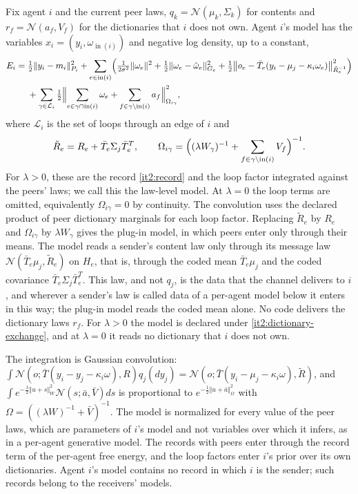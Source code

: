 Fix agent $i$ and the current peer laws, $q_k=\mathcal N(\mu_k,\Sigma_k)$ for contents and $r_f=\mathcal N(a_f,V_f)$ for the dictionaries that $i$ does not own. Agent $i$'s model has the variables $x_i=(y_i,\omega_{\operatorname{in}(i)})$ and negative log density, up to a constant,
\begin{equation}
\begin{aligned}
E_i={}&\tfrac12\Vert y_i-m_i\Vert_{P_i}^2+\sum_{e\in\operatorname{in}(i)}\Bigl(\tfrac1{2\sigma^2}\Vert\omega_e\Vert^2+\tfrac12\Vert\omega_e-\hat\omega_e\Vert_{G_e}^2+\tfrac12\bigl\Vert o_e-\bar T_e(y_i-\mu_j-\kappa_i\omega_e)\bigr\Vert_{\tilde R_e^{-1}}^2\Bigr)\\
&+\sum_{\gamma\in\mathcal L_i}\tfrac12\Bigl\Vert\sum_{e\in\gamma\cap\operatorname{in}(i)}\omega_e+\sum_{f\in\gamma\setminus\operatorname{in}(i)}a_f\Bigr\Vert_{\Omega_{i\gamma}}^2,
\end{aligned}
\label{it2:agent-energy}
\end{equation}
where $\mathcal L_i$ is the set of loops through an edge of $i$ and
\begin{equation}
\tilde R_e=R_e+\bar T_e\Sigma_j\bar T_e^T,\qquad
\Omega_{i\gamma}=\Bigl((\lambda W_\gamma)^{-1}+\sum_{f\in\gamma\setminus\operatorname{in}(i)}V_f\Bigr)^{-1}.
\label{it2:widening}
\end{equation}
For $\lambda>0$, these are the record \cref{it2:record} and the loop factor integrated against the peers' laws; we call this the law-level model. At $\lambda=0$ the loop terms are omitted, equivalently $\Omega_{i\gamma}=0$ by continuity. The convolution uses the declared product of peer dictionary marginals for each loop factor. Replacing $\tilde R_e$ by $R_e$ and $\Omega_{i\gamma}$ by $\lambda W_\gamma$ gives the plug-in model, in which peers enter only through their means. The model reads a sender's content law only through its message law $\mathcal N(\bar T_e\mu_j,\tilde R_e)$ on $H_e$, that is, through the coded mean $\bar T_e\mu_j$ and the coded covariance $\bar T_e\Sigma_j\bar T_e^T$. This law, and not $q_j$, is the data that the channel delivers to $i$, and wherever a sender's law is called data of a per-agent model below it enters in this way; the plug-in model reads the coded mean alone. No code delivers the dictionary laws $r_f$. For $\lambda>0$ the model is declared under \cref{it2:dictionary-exchange}, and at $\lambda=0$ it reads no dictionary that $i$ does not own.

The integration is Gaussian convolution: $\int\mathcal N(o;\bar T(y_i-y_j-\kappa_i\omega),R)q_j(dy_j)=\mathcal N(o;\bar T(y_i-\mu_j-\kappa_i\omega),\tilde R)$, and $\int e^{-\frac\lambda2\Vert u+s\Vert_W^2}\mathcal N(s;\bar a,\bar V)ds$ is proportional to $e^{-\frac12\Vert u+\bar a\Vert_\Omega^2}$ with $\Omega=((\lambda W)^{-1}+\bar V)^{-1}$. The model is normalized for every value of the peer laws, which are parameters of $i$'s model and not variables over which it infers, as in a per-agent generative model. The records with peers enter through the record term of the per-agent free energy, and the loop factors enter $i$'s prior over its own dictionaries. Agent $i$'s model contains no record in which $i$ is the sender; such records belong to the receivers' models.


